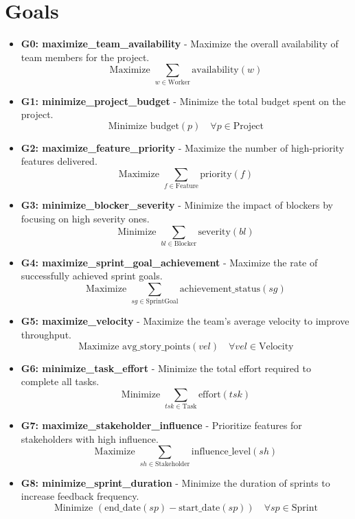 \documentclass[11pt]{article}
\begin{document}
\section{Goals}
\begin{itemize}
    \item \textbf{G0: maximize\_team\_availability} - Maximize the overall availability of team members for the project.
        \[ \text{Maximize } \sum_{w \in \text{Worker}} \text{availability}(w) \]
    \item \textbf{G1: minimize\_project\_budget} - Minimize the total budget spent on the project.
        \[ \text{Minimize } \text{budget}(p) \quad \forall p \in \text{Project} \]
    \item \textbf{G2: maximize\_feature\_priority} - Maximize the number of high-priority features delivered.
        \[ \text{Maximize } \sum_{f \in \text{Feature}} \text{priority}(f) \]
    \item \textbf{G3: minimize\_blocker\_severity} - Minimize the impact of blockers by focusing on high severity ones.
        \[ \text{Minimize } \sum_{bl \in \text{Blocker}} \text{severity}(bl) \]
    \item \textbf{G4: maximize\_sprint\_goal\_achievement} - Maximize the rate of successfully achieved sprint goals.
        \[ \text{Maximize } \sum_{sg \in \text{SprintGoal}} \text{achievement\_status}(sg) \]
    \item \textbf{G5: maximize\_velocity} - Maximize the team's average velocity to improve throughput.
        \[ \text{Maximize } \text{avg\_story\_points}(vel) \quad \forall vel \in \text{Velocity} \]
    \item \textbf{G6: minimize\_task\_effort} - Minimize the total effort required to complete all tasks.
        \[ \text{Minimize } \sum_{tsk \in \text{Task}} \text{effort}(tsk) \]
    \item \textbf{G7: maximize\_stakeholder\_influence} - Prioritize features for stakeholders with high influence.
        \[ \text{Maximize } \sum_{sh \in \text{Stakeholder}} \text{influence\_level}(sh) \]
    \item \textbf{G8: minimize\_sprint\_duration} - Minimize the duration of sprints to increase feedback frequency.
        \[ \text{Minimize } (\text{end\_date}(sp) - \text{start\_date}(sp)) \quad \forall sp \in \text{Sprint} \]
\end{itemize}
\end{document}
